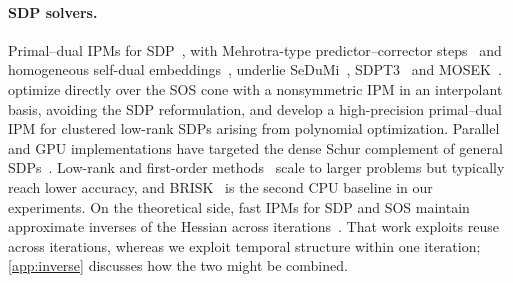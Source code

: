 \paragraph{SDP solvers.}
Primal--dual IPMs for SDP~\cite{helmberg1996interior,nesterov1997self,todd1998nesterov},
with Mehrotra-type predictor--corrector steps~\cite{mehrotra1992implementation}
and homogeneous self-dual embeddings~\cite{ye1994homogeneous}, underlie
SeDuMi~\cite{sturm1999sedumi}, SDPT3~\cite{toh1999sdpt3} and
MOSEK~\cite{mosek}. \citet{papp2019sos} optimize directly over the SOS cone
with a nonsymmetric IPM in an interpolant basis, avoiding the SDP reformulation,
and \citet{leijenhorst2024clustered} develop a high-precision primal--dual IPM
for clustered low-rank SDPs arising from polynomial optimization. Parallel and GPU implementations have targeted the dense
Schur complement of general SDPs~\cite{fujisawa2012sdpara}. Low-rank and
first-order methods~\cite{burer2003nonlinear} scale to larger problems but
typically reach lower accuracy, and BRISK~\cite{brisk} is the second CPU
baseline in our experiments.  On the theoretical side, fast IPMs for SDP and SOS maintain
approximate inverses of the Hessian across
iterations~\cite{jiang2020faster,jiang2022sos}. That work exploits reuse across
iterations, whereas we exploit temporal structure within one iteration;
\cref{app:inverse} discusses how the two might be combined.
